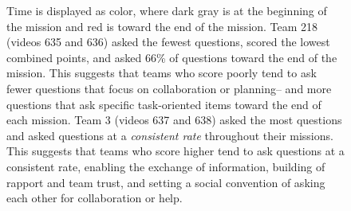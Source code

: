 \begin{figure}[h!]
    \centering
    \caption{Time is displayed as color, where dark gray is at the beginning of the mission and red is toward the end of the mission. Team 218 (videos 635 and 636) asked the
fewest questions, scored the lowest combined points, and asked 66\%
of questions toward the end of the mission. This suggests that teams who score poorly tend to ask fewer questions that focus on collaboration or planning-- and more questions that ask specific task-oriented items toward the end of each mission. Team 3 (videos 637 and 638) asked the most questions and asked questions at a \emph{consistent rate} throughout their missions. This suggests that teams who score higher tend to ask questions at a consistent rate, enabling the exchange of information, building of rapport and team trust, and setting a social convention of asking each other for collaboration or help. }
\end{figure}






